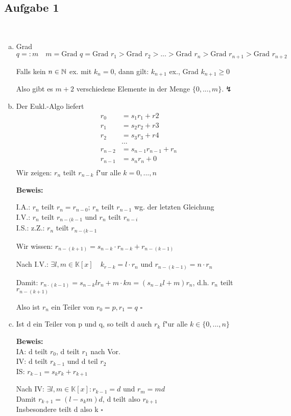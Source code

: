 \documentclass[a4paper,twoside,DIV15,BCOR12mm]{scrbook}
\newcommand{\enua}{\ \begin{enumerate}[a)]}
\newcommand{\une}{\end{enumerate}}
\renewcommand{\K}{\ensuremath{\mathbb{K}}}
\newcommand{\x}{\cdot}
\newcommand{\error}{\lightning}
\newenvironment{bew}{\pagebreak[2]\textbf{Beweis: }}{\qed}
\renewcommand{\qed}{\hspace*{\fill} \ensuremath{\square}}
\begin{document}
\subsection{Aufgabe 1}
\enua
\item Grad $q=:m\quad m=\text{Grad }q=\text{Grad }r_1>\text{Grad }r_2>...>\text{Grad }r_n>\text{Grad }r_{n+1}>\text{Grad }r_{n+2}$\par
Falls kein $n\in\mathbb{N}$ ex. mit $k_n=0$, dann gilt: $k_{n+1}$ ex., Grad $k_{n+1}\ge0$\par
Also gibt es $m+2$ verschiedene Elemente in der Menge $\{0,...,m\}$.$\error$
\item Der Eukl.-Algo liefert
\begin{eqnarray*}
r_0&=s_1r_1+r2\\
r_1&=s_2r_2+r3\\
r_2&=s_3r_3+r4\\
&...\\
r_{n-2}&=s_{n-1}r_{n-1}+r_n\\
r_{n-1}&=s_nr_n+0\\
\end{eqnarray*}
Wir zeigen: $r_n$ teilt $r_{n-k}$ f"ur alle $k=0,...,n$\par
\begin{bew}\par I.A.: $r_n$ teilt $r_n=r_{n-0}$; $r_n$ teilt $r_{n-1}$ wg. der letzten Gleichung\\
I.V.: $r_n$ teilt $r_{n-(k-1}$ und $r_n$ teilt $r_{n-i}$\\
I.S.: z.Z.: $r_n$ teilt $r_{n-(k-1}$\par
Wir wissen: $r_{n-(k+1)}=s_{n-k}\x r_{n-k}+r_{n-(k-1)}$\par
Nach I.V.: $\exists l,m\in\K[x]\quad k_{r-k}=l\x r_n$ und $r_{n-(k-1)}=n\x r_n$\par
Damit: $r_{n\x(k-1)}=s_{n-k}lr_n+m\x kn=(s_{n-k}l+m)r_n$, d.h. $r_n$ teilt $r_{n-(k+1)}$\par
Also ist $r_n$ ein Teiler von $r_0=p, r_1=q$
\end{bew}
\item
Ist d ein Teiler von p und q, so teilt d auch $r_k$ f"ur alle $k\in\{0,...,n\}$\par
\begin{bew}\\
IA: d teilt $r_0$, d teilt $r_1$ nach Vor.\\
IV: d teilt $r_{k-1}$ und d teil $r_2$\\
IS: $r_{k-1}=s_kr_k+r_{k+1}$\par
Nach IV: $\exists l,m\in\K[x]: r_{k-1}=d$ und $r_m=md$\\
Damit $r_{k+1}=(l-s_km)d$, d teilt also $r_{k+1}$\\
Insbesondere teilt d also k
\end{bew}
\une
\end{document}
